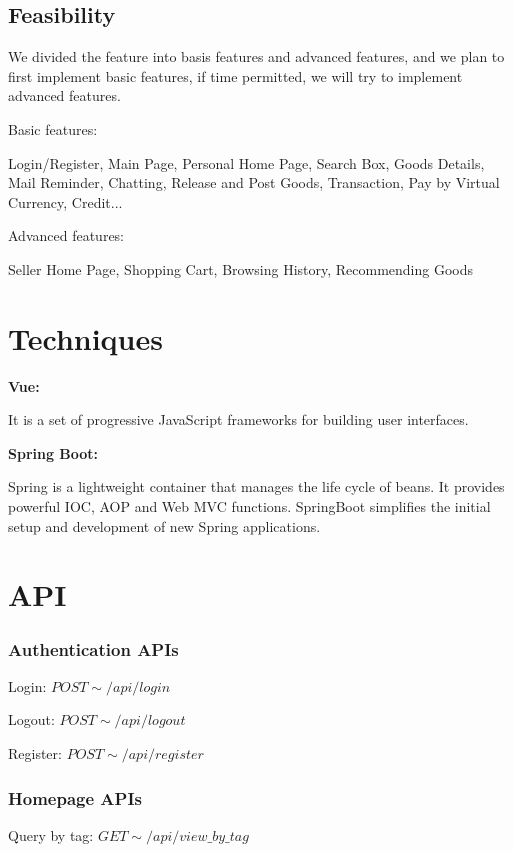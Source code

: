 \documentclass[12pt]{article}  %
\begin{document}
\subsection{Feasibility}

We divided the feature into basis features and advanced 
features, and we plan to first implement basic features, 
if time permitted, we will try to implement advanced 
features.

Basic features:

Login/Register, Main Page, Personal Home Page, Search Box, 
Goods Details, Mail Reminder, Chatting, Release and Post 
Goods, Transaction, Pay by Virtual Currency, Credit...

Advanced features:

Seller Home Page, Shopping Cart, Browsing History, 
Recommending Goods

\section{Techniques}
\begin{large}
	\textbf{Vue: }
\end{large}
It is a set of progressive JavaScript frameworks for 
building user interfaces. 


\begin{large}
	\textbf{Spring Boot: }
\end{large}
Spring is a lightweight container that manages the life 
cycle of beans. It provides powerful IOC, AOP and Web 
MVC functions. SpringBoot simplifies the initial setup 
and development of new Spring applications. 

\section{API}
\subsubsection*{Authentication APIs}
Login: $POST\sim/api/login$

Logout: $POST\sim/api/logout$

Register: $POST\sim/api/register$

\subsubsection*{Homepage APIs}

Query by tag: $GET\sim/api/view\_by\_tag$
\end{document}
